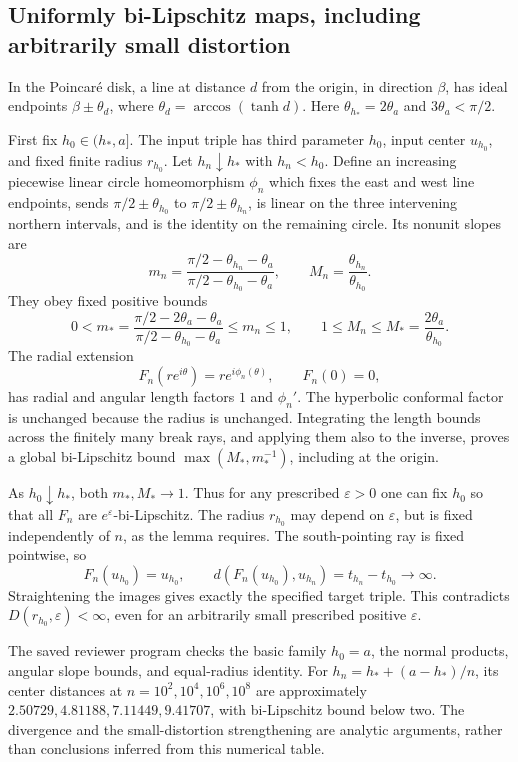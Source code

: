 \documentclass[10pt]{article}
\begin{document}
\subsection*{Uniformly bi-Lipschitz maps, including arbitrarily small distortion}
In the Poincaré disk, a line at distance \(d\) from the origin, in direction \(\beta\), has ideal endpoints \(\beta\pm\theta_d\), where \(\theta_d=\arccos(\tanh d)\). Here \(\theta_{h_*}=2\theta_a\) and \(3\theta_a<\pi/2\).\par
First fix \(h_0\in(h_*,a]\). The input triple has third parameter \(h_0\), input center \(u_{h_0}\), and fixed finite radius \(r_{h_0}\). Let \(h_n\downarrow h_*\) with \(h_n<h_0\). Define an increasing piecewise linear circle homeomorphism \(\phi_n\) which fixes the east and west line endpoints, sends \(\pi/2\pm\theta_{h_0}\) to \(\pi/2\pm\theta_{h_n}\), is linear on the three intervening northern intervals, and is the identity on the remaining circle. Its nonunit slopes are \[m_n=\frac{\pi/2-\theta_{h_n}-\theta_a}
           {\pi/2-\theta_{h_0}-\theta_a},\qquad
 M_n=\frac{\theta_{h_n}}{\theta_{h_0}}.\] They obey fixed positive bounds \[0<m_*=\frac{\pi/2-2\theta_a-\theta_a}
                 {\pi/2-\theta_{h_0}-\theta_a}
 \le m_n\le1,\qquad
 1\le M_n\le M_*=\frac{2\theta_a}{\theta_{h_0}}.\] The radial extension \[F_n(re^{i\theta})=re^{i\phi_n(\theta)},\qquad F_n(0)=0,\] has radial and angular length factors \(1\) and \(\phi_n'\). The hyperbolic conformal factor is unchanged because the radius is unchanged. Integrating the length bounds across the finitely many break rays, and applying them also to the inverse, proves a global bi-Lipschitz bound \(\max(M_*,m_*^{-1})\), including at the origin.\par
As \(h_0\downarrow h_*\), both \(m_*,M_*\to1\). Thus for any prescribed \(\varepsilon>0\) one can fix \(h_0\) so that all \(F_n\) are \(e^\varepsilon\)-bi-Lipschitz. The radius \(r_{h_0}\) may depend on \(\varepsilon\), but is fixed independently of \(n\), as the lemma requires. The south-pointing ray is fixed pointwise, so \[F_n(u_{h_0})=u_{h_0},\qquad
 d(F_n(u_{h_0}),u_{h_n})=t_{h_n}-t_{h_0}\longrightarrow\infty.\] Straightening the images gives exactly the specified target triple. This contradicts \(D(r_{h_0},\varepsilon)<\infty\), even for an arbitrarily small prescribed positive \(\varepsilon\).\par
The saved reviewer program checks the basic family \(h_0=a\), the normal products, angular slope bounds, and equal-radius identity. For \(h_n=h_*+(a-h_*)/n\), its center distances at \(n=10^2,10^4,10^6,10^8\) are approximately \(2.50729,4.81188,7.11449,9.41707\), with bi-Lipschitz bound below two. The divergence and the small-distortion strengthening are analytic arguments, rather than conclusions inferred from this numerical table.\par
\end{document}
